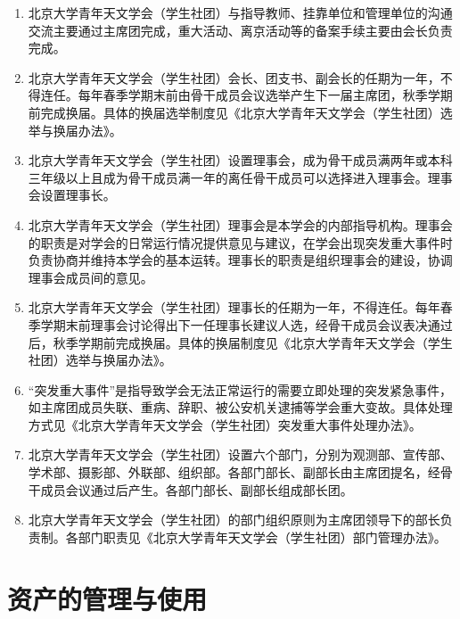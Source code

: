 \begin{enumerate}[resume]
    \item 北京大学青年天文学会（学生社团）与指导教师、挂靠单位和管理单位的沟通交流主要通过主席团完成，重大活动、离京活动等的备案手续主要由会长负责完成。
    
    \item 北京大学青年天文学会（学生社团）会长、团支书、副会长的任期为一年，不得连任。每年春季学期末前由骨干成员会议选举产生下一届主席团，秋季学期前完成换届。具体的换届选举制度见《北京大学青年天文学会（学生社团）选举与换届办法》。
    
    \item 北京大学青年天文学会（学生社团）设置理事会，成为骨干成员满两年或本科三年级以上且成为骨干成员满一年的离任骨干成员可以选择进入理事会。理事会设置理事长。
    
    \item 北京大学青年天文学会（学生社团）理事会是本学会的内部指导机构。理事会的职责是对学会的日常运行情况提供意见与建议，在学会出现突发重大事件时负责协商并维持本学会的基本运转。理事长的职责是组织理事会的建设，协调理事会成员间的意见。
    
    \item 北京大学青年天文学会（学生社团）理事长的任期为一年，不得连任。每年春季学期末前理事会讨论得出下一任理事长建议人选，经骨干成员会议表决通过后，秋季学期前完成换届。具体的换届制度见《北京大学青年天文学会（学生社团）选举与换届办法》。
    
    \item “突发重大事件”是指导致学会无法正常运行的需要立即处理的突发紧急事件，如主席团成员失联、重病、辞职、被公安机关逮捕等学会重大变故。具体处理方式见《北京大学青年天文学会（学生社团）突发重大事件处理办法》。
    
    \item 北京大学青年天文学会（学生社团）设置六个部门，分别为观测部、宣传部、学术部、摄影部、外联部、组织部。各部门部长、副部长由主席团提名，经骨干成员会议通过后产生。各部门部长、副部长组成部长团。
    
    \item 北京大学青年天文学会（学生社团）的部门组织原则为主席团领导下的部长负责制。各部门职责见《北京大学青年天文学会（学生社团）部门管理办法》。

\end{enumerate}

\section{资产的管理与使用}


